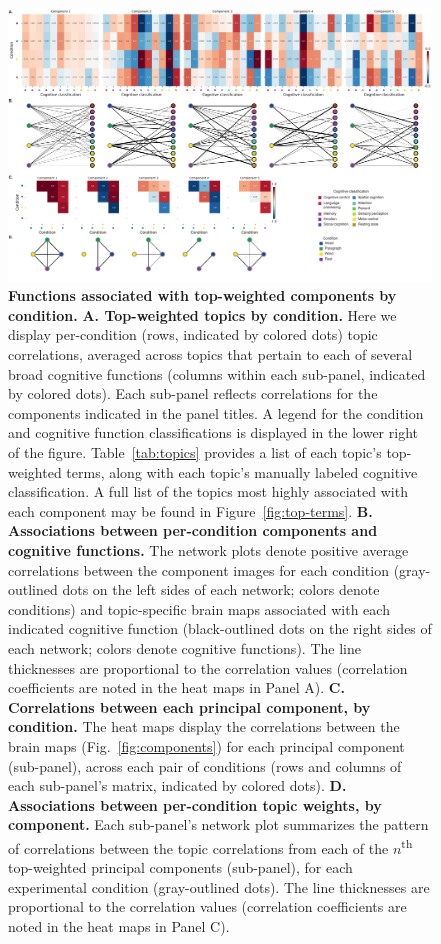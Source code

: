 \documentclass[english]{article}
\begin{document}
\begin{figure}[tp]
  \centering
  \includegraphics[width=\textwidth]{figs/components_neurosynth_full}

\caption{\textbf{Functions associated with top-weighted components by
condition.} \textbf{A. Top-weighted topics by condition.} Here we display
per-condition (rows, indicated by colored dots) topic correlations, averaged
across topics that pertain to each of several broad cognitive functions
(columns within each sub-panel, indicated by colored dots). Each sub-panel
reflects correlations for the components indicated in the panel titles. A
legend for the condition and cognitive function classifications is displayed in
the lower right of the figure. Table~\ref{tab:topics} provides a list of each topic's
top-weighted terms, along with each topic's manually labeled cognitive
classification. A full list of the topics most highly associated with each
component may be found in Figure~\ref{fig:top-terms}. \textbf{B. Associations
between per-condition components and cognitive functions.} The network plots
denote positive average correlations between the component images for each
condition (gray-outlined dots on the left sides of each network; colors denote
conditions) and topic-specific brain maps associated with each indicated
cognitive function (black-outlined dots on the right sides of each network;
colors denote cognitive functions). The line thicknesses are proportional to
the correlation values (correlation coefficients are noted in the heat maps in
Panel A). \textbf{C. Correlations between each principal component, by
condition.} The heat maps display the correlations between the brain maps
(Fig.~\ref{fig:components}) for each principal component (sub-panel), across each
pair of conditions (rows and columns of each sub-panel's matrix, indicated by
colored dots). \textbf{D. Associations between per-condition topic weights, by
component.} Each sub-panel's network plot summarizes the pattern of correlations
between the topic correlations from each of the $n$\textsuperscript{th}
top-weighted principal components (sub-panel), for each experimental condition
(gray-outlined dots). The line thicknesses are proportional to the correlation
values (correlation coefficients are noted in the heat maps in Panel C).}

\label{fig:neurosynth-full}
\end{figure}
\end{document}

